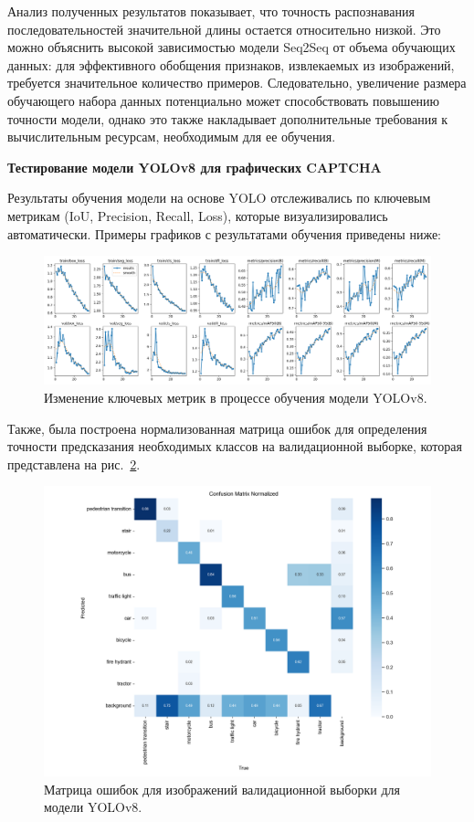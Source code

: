 Анализ полученных результатов показывает, что точность распознавания 
последовательностей значительной длины остается относительно низкой. Это можно 
объяснить высокой зависимостью модели Seq2Seq от объема обучающих данных: для 
эффективного обобщения признаков, извлекаемых из изображений, требуется 
значительное количество примеров. Следовательно, увеличение размера обучающего 
набора данных потенциально может способствовать повышению точности модели, 
однако это также накладывает дополнительные требования к вычислительным ресурсам, 
необходимым для ее обучения.

\textbf{Тестирование модели YOLOv8 для графических CAPTCHA}

Результаты обучения модели на основе YOLO отслеживались по ключевым метрикам 
(IoU, Precision, Recall, Loss), которые визуализировались автоматически. Примеры 
графиков с результатами обучения приведены ниже:

\begin{figure}[H]
    \centering
    \includegraphics[width=1\linewidth]{imgs/imagecaptcha/results.png}
    \caption{Изменение ключевых метрик в процессе обучения модели YOLOv8.}
    \label{fig:metrics}
\end{figure}
\vspace{-0.85cm}

Также, была построена нормализованная матрица ошибок для определения точности 
предсказания необходимых классов на валидационной выборке, которая представлена 
на рис.~\ref{fig:confusion}.

\begin{figure}[H]
    \centering
    \includegraphics[width=0.9\linewidth]{imgs/imagecaptcha/confusion_matrix_normalized.png}
    \caption{Матрица ошибок для изображений валидационной выборки для модели YOLOv8.}
    \label{fig:confusion}
\end{figure}
\vspace{-0.85cm}

